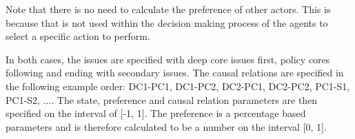 Note that there is no need to calculate the preference of other actors. This is because that is not used within the decision making process of the agents to select a specific action to perform.

In both cases, the issues are specified with deep core issues first, policy cores following and ending with secondary issues. The causal relations are specified in the following example order: DC1-PC1, DC1-PC2, DC2-PC1, DC2-PC2, PC1-S1, PC1-S2, .... The state, preference and causal relation parameters are then specified on the interval of [-1, 1]. The preference is a percentage based parameters and is therefore calculated to be a number on the interval [0, 1].



%
%
%
%
%
%


